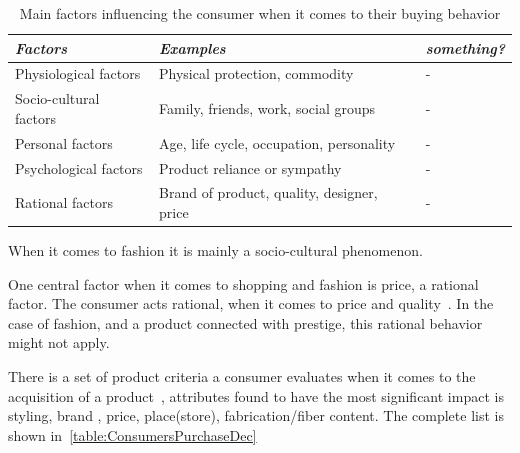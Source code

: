 \begin{table}[H]
    \centering
    \begin{tabular}{l|l|l}
      \emph{Factors}        & \emph{Examples} & \emph{something?} \\ \hline
      Physiological factors   & Physical protection, commodity & - \\ \hline
      Socio-cultural factors  & Family, friends, work, social groups & - \\ \hline
      Personal factors        & Age, life cycle, occupation, personality & - \\ \hline
      Psychological factors   & Product reliance or sympathy & - \\ \hline %
      Rational factors        & Brand of product, quality, designer, price & - \\
    \end{tabular}
    \caption[Fashion Factors]{Main factors influencing the consumer when it comes to their buying behavior}
    \label{table:FashionFactors}
\end{table}
When it comes to fashion it is mainly a socio-cultural phenomenon.

One central factor when it comes to shopping and fashion is price, a rational factor.
The consumer acts rational, when it comes to price and quality~\cite{Hanf1994}.
In the case of fashion, and a product connected with prestige, this rational
behavior might not apply.

There is a set of product criteria a consumer evaluates when it comes to the
acquisition of a product~\cite{dutton2006}, attributes found to have the most
significant impact is styling, brand , price, place(store), fabrication/fiber
content.  The complete list is shown in~\ref{table:ConsumersPurchaseDec}


